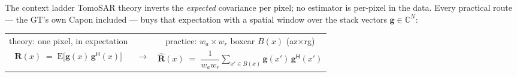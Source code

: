 \begin{frame}{The context ladder}
  \small
  TomoSAR theory inverts the \emph{expected} covariance per pixel; no estimator is
  per-pixel in the data. Every practical route --- the GT's own Capon included --- buys
  that expectation with a spatial window over the stack vectors $\mathbf{g} \in \mathbb{C}^{N}$:
  \begin{center}
  \vspace{-2pt}
  \begin{tabular}{ccc}
    {\scriptsize\color{soft} theory: one pixel, in expectation} & &
    {\scriptsize\color{soft} practice: $w_{a}{\times}w_{r}$ boxcar $B(x)$ (az${\times}$rg)} \\[3pt]
    $\mathbf{R}(x) \;=\; \mathrm{E}\big[\mathbf{g}(x)\,\mathbf{g}^{\mathsf H}(x)\big]$ &
    \quad$\longrightarrow$\quad &
    $\hat{\mathbf{R}}(x) \;=\; \dfrac{1}{w_{a}w_{r}} \displaystyle\sum_{x' \in B(x)} \mathbf{g}(x')\,\mathbf{g}^{\mathsf H}(x')$ \\
  \end{tabular}
  \vspace{-2pt}
  \end{center}
  \begin{center}
  \vspace{12pt}
  \begin{columns}[c,totalwidth=0.98\textwidth]
    \begin{column}{0.06\textwidth}
    \end{column}
    \begin{column}{0.60\textwidth}
      \centering
    \end{column}
    \begin{column}{0.32\textwidth}
      \centering
      \begin{tikzpicture}[scale=0.86]

\end{tikzpicture}
\end{column}
\end{columns}
\end{center}
\end{frame}

